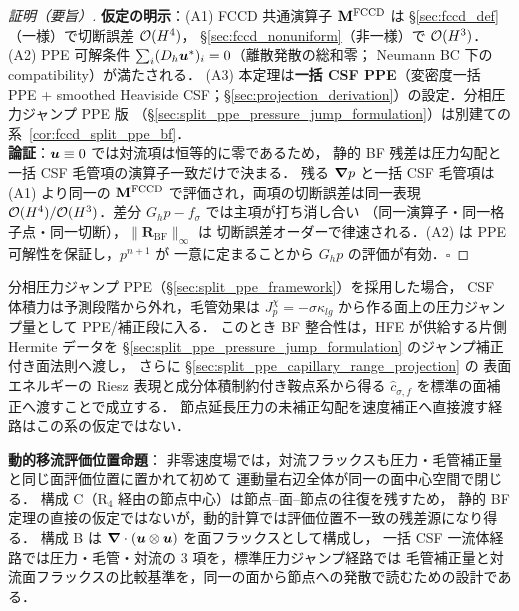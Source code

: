 \begin{proof}[\upshape 証明（要旨）]
\textbf{仮定の明示}：(A1) FCCD 共通演算子 $\mathbf{M}^{\mathrm{FCCD}}$ は
\S\ref{sec:fccd_def}（一様）で切断誤差 $\mathcal{O}(H^4)$，
\S\ref{sec:fccd_nonuniform}（非一様）で $\mathcal{O}(H^3)$．
(A2) PPE 可解条件 $\sum_i (D_h\bm{u}^*)_i = 0$（離散発散の総和零；
Neumann BC 下の compatibility）が満たされる．
(A3) 本定理は\textbf{一括 CSF PPE}（変密度一括 PPE + smoothed Heaviside
CSF；§\ref{sec:projection_derivation}）の設定．分相圧力ジャンプ PPE 版
（§\ref{sec:split_ppe_pressure_jump_formulation}）は別建ての
系~\ref{cor:fccd_split_ppe_bf}．\\
\textbf{論証}：$\bm{u}\equiv 0$ では対流項は恒等的に零であるため，
静的 BF 残差は圧力勾配と一括 CSF 毛管項の演算子一致だけで決まる．
残る $\bm{\nabla} p$ と一括 CSF 毛管項は (A1) より同一の
$\mathbf{M}^{\mathrm{FCCD}}$ で評価され，両項の切断誤差は同一表現
$\mathcal{O}(H^4)/\mathcal{O}(H^3)$．差分 $G_h p - f_\sigma$ では主項が打ち消し合い
（同一演算子・同一格子点・同一切断），$\|\mathbf{R}_\text{BF}\|_\infty$ は
切断誤差オーダーで律速される．(A2) は PPE 可解性を保証し，$p^{n+1}$ が
一意に定まることから $G_h p$ の評価が有効．$\square$
\end{proof}

\begin{corollary}
\label{cor:fccd_split_ppe_bf}
分相圧力ジャンプ PPE（§\ref{sec:split_ppe_framework}）を採用した場合，
CSF 体積力は予測段階から外れ，毛管効果は
$J_p^\chi=-\sigma\kappa_{lg}$ から作る面上の圧力ジャンプ量として PPE/補正段に入る．
このとき BF 整合性は，HFE が供給する片側 Hermite データを
§\ref{sec:split_ppe_pressure_jump_formulation} のジャンプ補正付き面法則へ渡し，
さらに §\ref{sec:split_ppe_capillary_range_projection} の
表面エネルギーの Riesz 表現と成分体積制約付き鞍点系から得る
$\widehat c_{\sigma,f}$ を標準の面補正へ渡すことで成立する．
節点延長圧力の未補正勾配を速度補正へ直接渡す経路はこの系の仮定ではない．
\end{corollary}

\noindent\textbf{動的移流評価位置命題}：
非零速度場では，対流フラックスも圧力・毛管補正量と同じ面評価位置に置かれて初めて
運動量右辺全体が同一の面中心空間で閉じる．
構成 C（R$_4$ 経由の節点中心）は節点--面--節点の往復を残すため，
静的 BF 定理の直接の仮定ではないが，動的計算では評価位置不一致の残差源になり得る．
構成 B は $\bm{\nabla}\cdot(\bm{u}\otimes\bm{u})$ を面フラックスとして構成し，
一括 CSF 一流体経路では圧力・毛管・対流の 3 項を，標準圧力ジャンプ経路では
毛管補正量と対流面フラックスの比較基準を，同一の面から節点への発散で読むための設計である．

